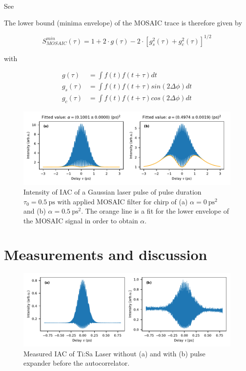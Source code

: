 See \textcite{hirayama_real-time_2002}

The lower bound (minima envelope) of the MOSAIC trace is therefore given by

\begin{equation}
S^{min}_{MOSAIC}(\tau)= 1 + 2 \cdot g(\tau) - 2 \cdot [g_s^2(\tau)+g_c^2(\tau)]^{1/2}
\end{equation}

with 

\begin{align}
g(\tau)&=\int f(t)f(t+\tau)dt\\
g_s(\tau)&=\int f(t)f(t+\tau)sin(2\Delta\phi)dt\\
g_c(\tau)&=\int f(t)f(t+\tau)cos(2\Delta\phi)dt
\end{align}


\begin{figure}[H]
	\centering
	\includegraphics[width=\linewidth]{figures/chirp/plots/mosaic_chirped_laser_pulse_fit_envelope}
	\caption{Intensity of IAC of a Gaussian laser pulse of pulse duration $\tau_0=\SI{0.5}{\pico \second}$ with applied MOSAIC filter for chirp of (a) $\alpha = \SI{0}{\pico \second \squared}$ and (b) $\alpha = \SI{0.5}{\pico \second \squared}$.
	The orange line is a fit for the lower envelope of the MOSAIC signal in order to obtain $\alpha$.}
	\label{fig:mosaicchirpedlaserpulsefitenvelope}
\end{figure}




\section{Measurements and discussion}

\begin{figure}[H]
	\centering
	\includegraphics[width=\linewidth]{figures/chirp/plots/measured_chirped_laser_pulse_before_MOSAIC}
	\caption{Measured IAC of Ti:Sa Laser without (a) and with (b) pulse expander before the autocorrelator.}
	\label{fig:measuredchirpedlaserpulsebeforemosaic}
\end{figure}

